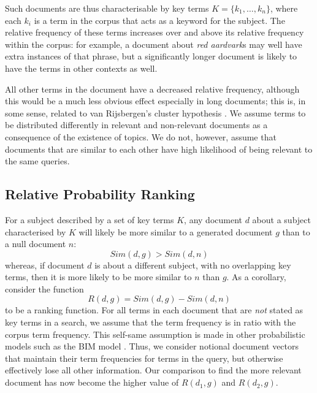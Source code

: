 Such documents are thus characterisable by key terms $K = \{k_1, \ldots, k_n \}$, where each $k_i$ is a term in the corpus that acts as a keyword for the subject. The relative frequency of these terms increases over and above its relative frequency within the corpus: for example, a document about \emph{red aardvark}s may well have extra instances of that phrase, but a significantly longer document is likely to have the terms in other contexts as well.

All other terms in the document have a decreased relative frequency, although this would be a much less obvious effect especially in long documents; this is, in some sense, related to van Rijsbergen's cluster hypothesis \cite{rijsbergen:1979}. We assume terms to be distributed differently in relevant and non-relevant documents as a consequence of the existence of topics. We do not, however, assume that documents that are similar to each other have high likelihood of being relevant to the same queries. 
\subsection{Relative Probability Ranking}
For a subject described by a set of key terms $K$, any document $d$ about a subject characterised by $K$ will likely be more similar to a generated document $g$ than to a null document $n$: 
\begin{equation}
 Sim(d, g) > Sim(d, n)
\end{equation}
whereas, if document $d$ is about a different subject, with no overlapping key terms, then it is more likely to be more similar to $n$ than $g$.  As a corollary, consider the function
   \begin{equation}
       R(d,g) = Sim(d, g) -  Sim(d, n)
   \end{equation}
to be a ranking function. 
%
For all terms in each document that are \emph{not} stated as key terms in a search, we assume that the term frequency is in ratio with the corpus term frequency. This self-same assumption is made in other probabilistic models such as the BIM model \cite{zhai:2008}. Thus, we consider notional document vectors that maintain their term frequencies for terms in the query, but otherwise effectively lose all other information. 
Our comparison to find the more relevant document has now become the higher value of $R(d_1, g)$ and $R(d_2, g)$.

